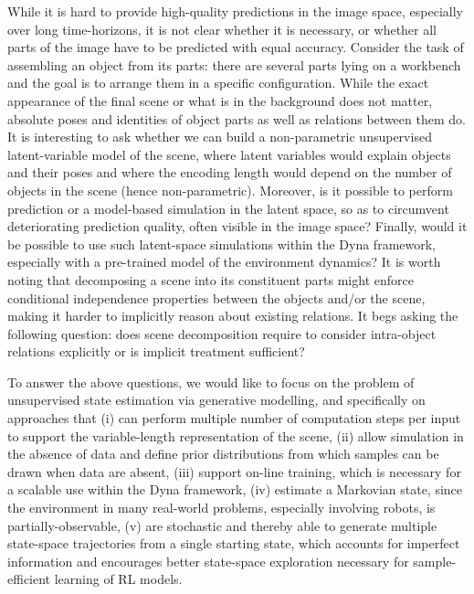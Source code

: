    While it is hard to provide high-quality predictions in the image space, especially over long time-horizons, it is not clear whether it is necessary, or whether all parts of the image have to be predicted with equal accuracy. 
    Consider the task of assembling an object from its parts: 
    there are several parts lying on a workbench and the goal is to arrange them in a specific configuration. 
    While the exact appearance of the final scene or what is in the background does not matter, absolute poses and identities of object parts as well as relations between them do. 
    It is interesting to ask whether we can build a non-parametric unsupervised latent-variable model of the scene, where latent variables would explain objects and their poses and where the encoding length would depend on the number of objects in the scene (hence non-parametric).
    Moreover, is it possible to perform prediction or a model-based simulation in the latent space, so as to circumvent deteriorating prediction quality, often visible in the image space? 
    Finally, would it be possible to use such latent-space simulations within the Dyna framework, especially with a pre-trained model of the environment dynamics? 
    It is worth noting that decomposing a scene into its constituent parts might enforce conditional independence properties between the objects and/or the scene, making it harder to implicitly reason about existing relations. 
    It begs asking the following question: does scene decomposition require to consider intra-object relations explicitly or is implicit treatment sufficient?

    To answer the above questions, we would like to focus on the problem of unsupervised state estimation via generative modelling, and specifically on approaches that 
    (i) can perform multiple number of computation steps per input to support the variable-length representation of the scene, 
    (ii) allow simulation in the absence of data and define prior distributions from which samples can be drawn when data are absent, 
    (iii) support on-line training, which is necessary for a scalable use within the Dyna framework, 
    (iv) estimate a Markovian state, since the environment in many real-world problems, especially involving robots, is partially-observable, 
    (v) are stochastic and thereby able to generate multiple state-space trajectories from a single starting state, which accounts for imperfect information and encourages better state-space exploration necessary for sample-efficient learning of RL models.
    

